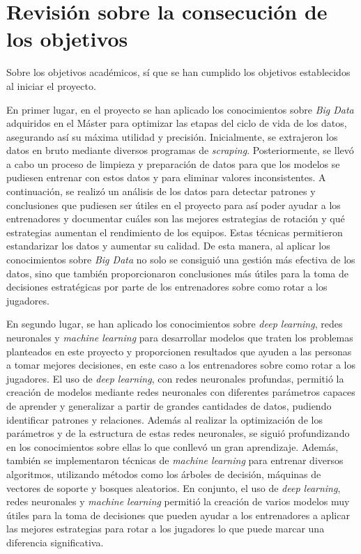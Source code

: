 \section{Revisión sobre la consecución de los objetivos}



Sobre los objetivos académicos, sí que se han cumplido los objetivos establecidos al iniciar el proyecto. 

En primer lugar, en el proyecto se han aplicado los conocimientos sobre \textit{Big Data} adquiridos en el Máster para optimizar las etapas del ciclo de vida de los datos, asegurando así su máxima utilidad y precisión. Inicialmente, se extrajeron los datos en bruto mediante diversos programas de \textit{scraping}. Posteriormente, se llevó a cabo un proceso de limpieza y preparación de datos para que los modelos se pudiesen entrenar con estos datos y para eliminar valores inconsistentes. A continuación, se realizó un análisis de los datos para detectar patrones y conclusiones que pudiesen ser útiles en el proyecto para así poder ayudar a los entrenadores y documentar cuáles son las mejores estrategias de rotación y qué estrategias aumentan el rendimiento de los equipos. Estas técnicas permitieron estandarizar los datos y aumentar su calidad. De esta manera, al aplicar los conocimientos sobre \textit{Big Data} no solo se consiguió una gestión más efectiva de los datos, sino que también proporcionaron conclusiones más útiles para la toma de decisiones estratégicas por parte de los entrenadores sobre como rotar a los jugadores.

En segundo lugar, se han aplicado los conocimientos sobre \textit{deep learning}, redes neuronales y \textit{machine learning} para desarrollar modelos que traten los problemas planteados en este proyecto y proporcionen resultados que ayuden a las personas a tomar mejores decisiones, en este caso a los entrenadores sobre como rotar a los jugadores. El uso de \textit{deep learning}, con redes neuronales profundas, permitió la creación de modelos mediante redes neuronales con diferentes parámetros capaces de aprender y generalizar a partir de grandes cantidades de datos, pudiendo identificar patrones y relaciones. Además al realizar la optimización de los parámetros y de la estructura de estas redes neuronales, se siguió profundizando en los conocimientos sobre ellas lo que conllevó un gran aprendizaje. Además, también se implementaron técnicas de \textit{machine learning} para entrenar diversos algoritmos, utilizando métodos como los árboles de decisión, máquinas de vectores de soporte y bosques aleatorios. En conjunto, el uso de \textit{deep learning}, redes neuronales y \textit{machine learning} permitió la creación de varios modelos muy útiles para la toma de decisiones que pueden ayudar a los entrenadores a aplicar las mejores estrategias para rotar a los jugadores lo que puede marcar una diferencia significativa.



